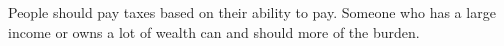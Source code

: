 People should pay taxes based on their ability to pay. Someone who has a large income or owns a lot of wealth can and should more of the burden.
